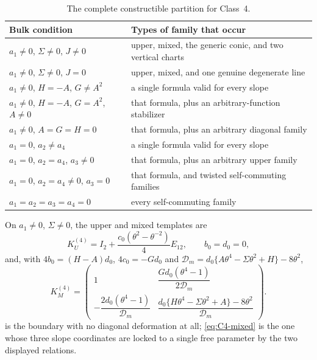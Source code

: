 \documentclass[11pt,reqno]{amsart}
\theoremstyle{plain}
\theoremstyle{definition}
\theoremstyle{remark}
\numberwithin{equation}{section}
\newcommand{\Id}{I_2}
\begin{document}
\begin{table}[t]
\centering\footnotesize
\caption{The complete constructible partition for Class~4.}
\label{tab:C4-cells}
\begin{tabularx}{\textwidth}{>{\RaggedRight\arraybackslash}X >{\RaggedRight\arraybackslash}X}
\toprule
Bulk condition & Types of family that occur \\
\midrule
$a_1\ne0$, $\Sigma\ne0$, $J\ne0$ & upper, mixed, the generic conic, and two vertical charts \\
$a_1\ne0$, $\Sigma\ne0$, $J=0$ & upper, mixed, and one genuine degenerate line \\
$a_1\ne0$, $H=-A$, $G\ne A^2$ & a single formula valid for every slope \\
$a_1\ne0$, $H=-A$, $G=A^2$, $A\ne0$ & that formula, plus an arbitrary-function stabilizer \\
$a_1\ne0$, $A=G=H=0$ & that formula, plus an arbitrary diagonal family \\
$a_1=0$, $a_2\ne a_4$ & a single formula valid for every slope \\
$a_1=0$, $a_2=a_4$, $a_3\ne0$ & that formula, plus an arbitrary upper family \\
$a_1=0$, $a_2=a_4\ne0$, $a_3=0$ & that formula, and twisted self-commuting families \\
$a_1=a_2=a_3=a_4=0$ & every self-commuting family \\
\bottomrule
\end{tabularx}
\end{table}

On $a_1\ne0$, $\Sigma\ne0$, the upper and mixed templates are
\begin{equation}
K_U^{(4)}=\Id+\frac{c_0(\theta^2-\theta^{-2})}{4}E_{12},\qquad
b_0=d_0=0,                                    \label{eq:C4-upper}
\end{equation}
and, with $4b_0=(H-A)d_0$, $4c_0=-Gd_0$ and
$\mathcal D_m=d_0\{A\theta^4-\Sigma\theta^2+H\}-8\theta^2$,
\begin{equation}
K_M^{(4)}=\begin{pmatrix}
1&\dfrac{Gd_0(\theta^4-1)}{2\mathcal D_m}\\[2mm]
-\dfrac{2d_0(\theta^4-1)}{\mathcal D_m}&
\dfrac{d_0\{H\theta^4-\Sigma\theta^2+A\}-8\theta^2}{\mathcal D_m}
\end{pmatrix}.                                      \label{eq:C4-mixed}
\end{equation}
 is the boundary with no diagonal deformation at all;
\cref{eq:C4-mixed} is the one whose three slope coordinates are locked to a
single free parameter by the two displayed relations.
\end{document}
